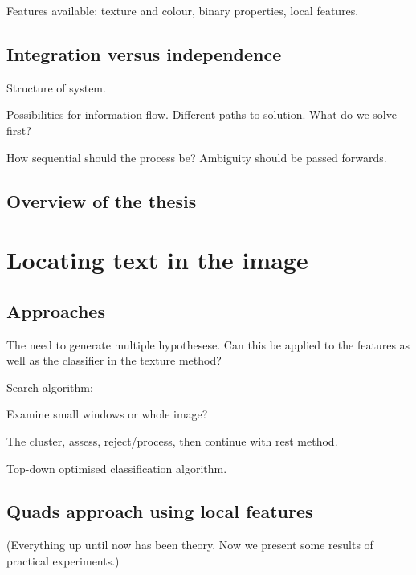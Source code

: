Features available: texture and colour, binary properties, local features.



\section{Integration versus independence} %

Structure of system.

Possibilities for information flow.  Different paths to solution.  What do we solve first?

How sequential should the process be?  Ambiguity should be passed forwards.



\section{Overview of the thesis} %




\chapter{Locating text in the image}


\section{Approaches} %

The need to generate multiple hypothesese.  Can this be applied to the features as well as the classifier in the texture method?

Search algorithm:

Examine small windows or whole image?

The cluster, assess, reject/process, then continue with rest method.

Top-down optimised classification algorithm.



\section{Quads approach using local features} %

(Everything up until now has been theory.  Now we present some results of practical experiments.)



